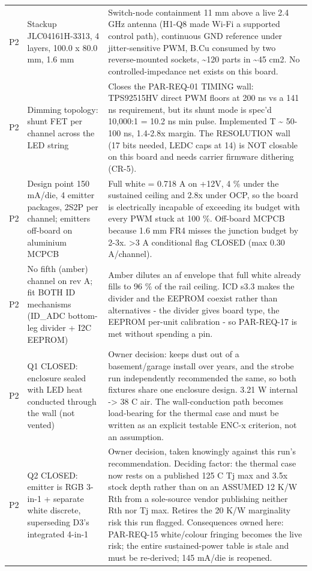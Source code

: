 \documentclass[11pt,a4paper]{article}
\begin{document}
{\begin{longtable}{lp{5.2cm}p{7.2cm}}
P2 & Stackup JLC04161H-3313, 4 layers, 100.0 x 80.0 mm, 1.6 mm & Switch-node containment 11 mm above a live 2.4 GHz antenna (H1-Q8 made Wi-Fi a supported control path), continuous GND reference under jitter-sensitive PWM, B.Cu consumed by two reverse-mounted sockets, \textasciitilde{}120 parts in \textasciitilde{}45 cm2. No controlled-impedance net exists on this board. \\
P2 & Dimming topology: shunt FET per channel across the LED string & Closes the PAR-REQ-01 TIMING wall: TPS92515HV direct PWM floors at 200 ns vs a 141 ns requirement, but its shunt mode is spec'd 10,000:1 = 10.2 ns min pulse. Implemented T \textasciitilde{} 50-100 ns, 1.4-2.8x margin. The RESOLUTION wall (17 bits needed, LEDC caps at 14) is NOT closable on this board and needs carrier firmware dithering (CR-5). \\
P2 & Design point 150 mA/die, 4 emitter packages, 2S2P per channel; emitters off-board on aluminium MCPCB & Full white = 0.718 A on +12V, 4 \% under the sustained ceiling and 2.8x under OCP, so the board is electrically incapable of exceeding its budget with every PWM stuck at 100 \%. Off-board MCPCB because 1.6 mm FR4 misses the junction budget by 2-3x. \textgreater{}3 A conditional flag CLOSED (max 0.30 A/channel). \\
P2 & No fifth (amber) channel on rev A; fit BOTH ID mechanisms (ID\_ADC bottom-leg divider + I2C EEPROM) & Amber dilutes an af envelope that full white already fills to 96 \% of the rail ceiling. ICD s3.3 makes the divider and the EEPROM coexist rather than alternatives - the divider gives board type, the EEPROM per-unit calibration - so PAR-REQ-17 is met without spending a pin. \\
P2 & Q1 CLOSED: enclosure sealed with LED heat conducted through the wall (not vented) & Owner decision: keeps dust out of a basement/garage install over years, and the strobe run independently recommended the same, so both fixtures share one enclosure design. 3.21 W internal -\textgreater{} 38 C air. The wall-conduction path becomes load-bearing for the thermal case and must be written as an explicit testable ENC-x criterion, not an assumption. \\
P2 & Q2 CLOSED: emitter is RGB 3-in-1 + separate white discrete, superseding D3's integrated 4-in-1 & Owner decision, taken knowingly against this run's recommendation. Deciding factor: the thermal case now rests on a published 125 C Tj max and 3.5x stock depth rather than on an ASSUMED 12 K/W Rth from a sole-source vendor publishing neither Rth nor Tj max. Retires the 20 K/W marginality risk this run flagged. Consequences owned here: PAR-REQ-15 white/colour fringing becomes the live risk; the entire sustained-power table is stale and must be re-derived; 145 mA/die is reopened. \\

\end{longtable}}
\end{document}
